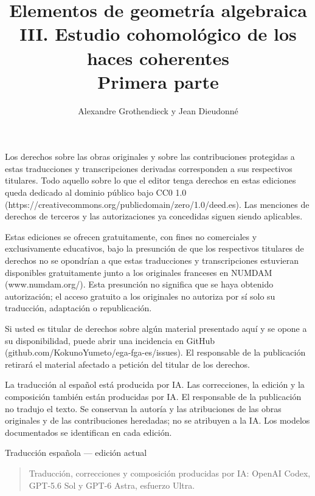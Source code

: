 Los derechos sobre las obras originales y sobre las contribuciones protegidas a estas traducciones y transcripciones derivadas corresponden a sus respectivos titulares. Todo aquello sobre lo que el editor tenga derechos en estas ediciones queda dedicado al dominio público bajo CC0 1.0 (https://creativecommons.org/publicdomain/zero/1.0/deed.es). Las menciones de derechos de terceros y las autorizaciones ya concedidas siguen siendo aplicables.

Estas ediciones se ofrecen gratuitamente, con fines no comerciales y exclusivamente educativos, bajo la presunción de que los respectivos titulares de derechos no se opondrían a que estas traducciones y transcripciones estuvieran disponibles gratuitamente junto a los originales franceses en NUMDAM (www.numdam.org/). Esta presunción no significa que se haya obtenido autorización; el acceso gratuito a los originales no autoriza por sí solo su traducción, adaptación o republicación.

Si usted es titular de derechos sobre algún material presentado aquí y se opone a su disponibilidad, puede abrir una incidencia en GitHub (github.com/KokunoYumeto/ega-fga-es/issues). El responsable de la publicación retirará el material afectado a petición del titular de los derechos.

La traducción al español está producida por IA. Las correcciones, la edición y la composición también están producidas por IA. El responsable de la publicación no tradujo el texto. Se conservan la autoría y las atribuciones de las obras originales y de las contribuciones heredadas; no se atribuyen a la IA. Los modelos documentados se identifican en cada edición.
\par
\endgroup
\clearpage


\title[EGA III-1 --- Estudio cohomológico --- Primera parte]{Elementos de geometría algebraica\\
III. Estudio cohomológico de los haces coherentes\\
Primera parte}
\author{Alexandre Grothendieck y Jean Dieudonné}
\date{}
\maketitle

\begin{center}
\large Traducción española — edición actual
\end{center}

\begin{quote}\small
Traducción, correcciones y composición producidas por IA: OpenAI Codex, GPT-5.6 Sol y GPT-6 Astra, esfuerzo Ultra.
\end{quote}

